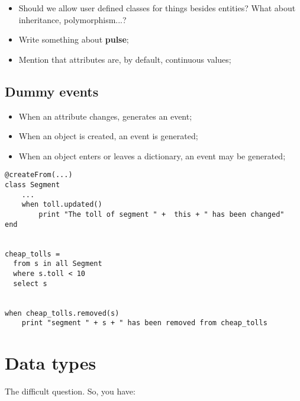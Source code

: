 \documentclass{report}
\begin{document}
\begin{itemize}
\item Should we allow user defined classes for things besides
  entities? What about inheritance, polymorphism...?
\item Write something about \textbf{pulse};
\item Mention that attributes are, by default, continuous values;
\end{itemize}


\section{Dummy events}

\begin{itemize}
\item When an attribute changes, generates an event;
\item When an object is created, an event is generated;
\item When an object enters or leaves a dictionary, an event may be
  generated;
\end{itemize}


\begin{verbatim}
@createFrom(...)
class Segment
    ...
    when toll.updated()
        print "The toll of segment " +  this + " has been changed"
end


cheap_tolls =
  from s in all Segment
  where s.toll < 10
  select s


when cheap_tolls.removed(s)
    print "segment " + s + " has been removed from cheap_tolls
\end{verbatim}


\chapter{Data types}

The difficult question. So, you have:
\end{document}
